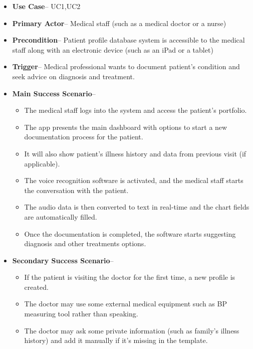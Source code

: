 \documentclass[12pt]{article}
\begin{document}
\begin{itemize}
  \item\textbf{Use Case}-- UC1,UC2
  \item\textbf{Primary Actor}-- Medical staff (such as a medical doctor or a nurse)
  \item\textbf{Precondition}-- Patient profile database system is accessible to the medical staff along with an electronic device (such as an iPad or a tablet)
  \item\textbf{Trigger}-- Medical professional wants to document patient’s condition and seek advice on diagnosis and treatment.
  \item\textbf{Main Success Scenario}--
  \begin{itemize}
    \item{The medical staff logs into the system and access the patient’s portfolio.}
    \item{The app presents the main dashboard with options to start a new documentation process for the patient.}
    \item{It will also show patient’s illness history and data from previous visit (if applicable).}
    \item{The voice recognition software is activated, and the medical staff starts the conversation with the patient.}
    \item{The audio data is then converted to text in real-time and the chart fields are automatically filled.}
    \item{Once the documentation is completed, the software starts suggesting diagnosis and other treatments options.}
  \end{itemize}
  \item\textbf{Secondary Success Scenario}--
  \begin{itemize}[label=1.\arabic*]
    \item{If the patient is visiting the doctor for the first time, a new profile is created.}
  \end{itemize}
  \begin{itemize}[label=4.\arabic*]
    \item{The doctor may use some external medical equipment such as BP measuring tool rather than speaking.}
  \end{itemize}
  \begin{itemize}[label=5.\arabic*]
    \item{The doctor may ask some private information (such as family’s illness history) and add it manually if it’s missing in the template.}

\end{itemize}
\end{itemize}
\end{document}
